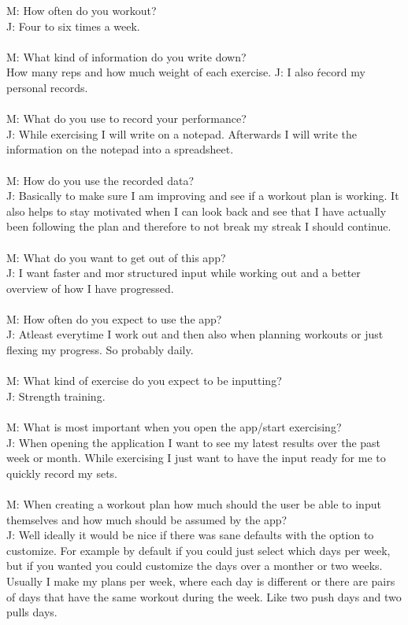 \documentclass{article}
\begin{document}
M: How often do you workout?\\
J: Four to six times a week.
\\ \\
M: What kind of information do you write down?\\
How many reps and how much weight of each exercise.
J: I also ŕecord my personal records.
\\ \\
M: What do you use to record your performance?\\
J: While exercising I will write on a notepad. Afterwards I will write the information on the notepad into a spreadsheet.
\\ \\
M: How do you use the recorded data?\\
J: Basically to make sure I am improving and see if a workout plan is working. It also helps to stay motivated when I can look back and see that I have actually been following the plan and therefore to not break my streak I should continue.
\\ \\
M: What do you want to get out of this app?\\
J: I want faster and mor structured input while working out and a better overview of how I have progressed.
\\ \\
M: How often do you expect to use the app?\\
J: Atleast everytime I work out and then also when planning workouts or just flexing my progress. So probably daily.
\\ \\
M: What kind of exercise do you expect to be inputting?\\
J: Strength training.
\\ \\
M: What is most important when you open the app/start exercising?\\
J: When opening the application I want to see my latest results over the past week or month. While exercising I just want to have the input ready for me to quickly record my sets.
\\ \\
M: When creating a workout plan how much should the user be able to input themselves and how much should be assumed by the app?\\
J: Well ideally it would be nice if there was sane defaults with the option to customize. For example by default if you could just select which days per week, but if you wanted you could customize the days over a monther or two weeks. Usually I make my plans per week, where each day is different or there are pairs of days that have the same workout during the week. Like two push days and two pulls days.
\end{document}
